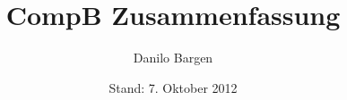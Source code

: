 


\subject{Compilerbau}
\title{CompB Zusammenfassung}
\author{Danilo Bargen}
\date{Stand: 7. Oktober 2012}











